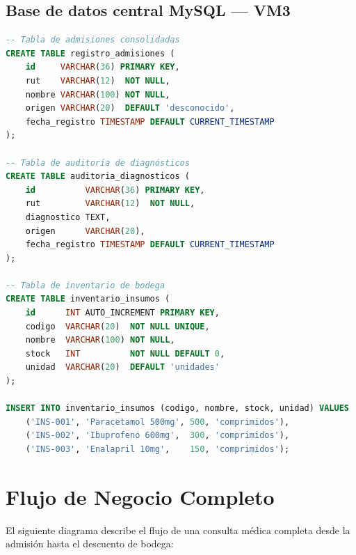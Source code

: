 \documentclass[11pt,a4paper]{article}
\begin{document}
\subsection{Base de datos central MySQL — VM3}

\begin{lstlisting}[language=SQL, caption=Tablas de la base de datos central en MySQL]
-- Tabla de admisiones consolidadas
CREATE TABLE registro_admisiones (
    id     VARCHAR(36) PRIMARY KEY,
    rut    VARCHAR(12)  NOT NULL,
    nombre VARCHAR(100) NOT NULL,
    origen VARCHAR(20)  DEFAULT 'desconocido',
    fecha_registro TIMESTAMP DEFAULT CURRENT_TIMESTAMP
);

-- Tabla de auditoría de diagnósticos
CREATE TABLE auditoria_diagnosticos (
    id          VARCHAR(36) PRIMARY KEY,
    rut         VARCHAR(12)  NOT NULL,
    diagnostico TEXT,
    origen      VARCHAR(20),
    fecha_registro TIMESTAMP DEFAULT CURRENT_TIMESTAMP
);

-- Tabla de inventario de bodega
CREATE TABLE inventario_insumos (
    id      INT AUTO_INCREMENT PRIMARY KEY,
    codigo  VARCHAR(20)  NOT NULL UNIQUE,
    nombre  VARCHAR(100) NOT NULL,
    stock   INT          NOT NULL DEFAULT 0,
    unidad  VARCHAR(20)  DEFAULT 'unidades'
);

INSERT INTO inventario_insumos (codigo, nombre, stock, unidad) VALUES
    ('INS-001', 'Paracetamol 500mg', 500, 'comprimidos'),
    ('INS-002', 'Ibuprofeno 600mg',  300, 'comprimidos'),
    ('INS-003', 'Enalapril 10mg',    150, 'comprimidos');
\end{lstlisting}

\section{Flujo de Negocio Completo}

El siguiente diagrama describe el flujo de una consulta médica completa desde
la admisión hasta el descuento de bodega:
\end{document}
